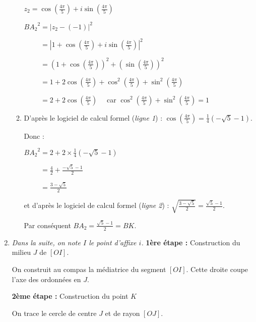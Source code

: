 \begin{corrige}
\begin{enumerate}
\begin{enumerate}[label=\alph*.]
          $z_2=\cos\left(\frac{4\pi}{5}\right)+i\sin\left(\frac{4\pi}{5}\right)$
          \par
          $B{A_2}^2=\left|z_2-(-1) \right|^2$
          \par
          $\phantom{B{A_2}^2}=\left|1+\cos\left(\frac{4\pi}{5}\right)+i\sin\left(\frac{4\pi}{5}\right) \right|^2$
          \par
          $\phantom{B{A_2}^2}=\left(1+\cos\left(\frac{4\pi}{5}\right)\right)^2+\left(\sin\left(\frac{4\pi}{5}\right) \right)^2$
          \par
          $\phantom{B{A_2}^2}=1+2\cos\left(\frac{4\pi}{5}\right)+\cos^2\left(\frac{4\pi}{5}\right)+\sin^2\left(\frac{4\pi}{5}\right)$
          \par
          $\phantom{B{A_2}^2}=2+2\cos\left(\frac{4\pi}{5}\right)\quad$ car $\cos^2\left(\frac{4\pi}{5}\right)+\sin^2\left(\frac{4\pi}{5}\right)=1 $
          \item
          D'après le logiciel de calcul formel (\textit{ligne 1}) : $\cos\left(\frac{4\pi}{5}\right)=  \frac{1}{4}\left(- \sqrt{5}-1\right)$.
          \par
          Donc :
          \par
          $B{A_2}^2=2+2 \times \frac{1}{4}\left(-\sqrt{5}-1\right)$
          \par
          $\phantom{B{A_2}^2}=\frac{4}{2}+\frac{-\sqrt{5}-1}{2}$
          \par
          $\phantom{B{A_2}^2}=\frac{3-\sqrt{5}}{2}$
          \par
          et d'après le logiciel de calcul formel (\textit{ligne 2}) : $\sqrt{\frac{3-\sqrt{5}}{2}} = \frac{\sqrt{5}-1}{2} $.
          \par
          Par conséquent $BA_2=\frac{\sqrt{5}-1}{2}=BK$.
     \end{enumerate}
     \item
     \textit{Dans la suite, on note $I$ le point d'affixe $i$.}
     \textbf{1ère étape : } Construction du milieu $J$ de $[OI]$.
     \par
     On construit au compas la médiatrice du segment $[OI]$. Cette droite coupe l'axe des ordonnées en $J$.
\begin{center}
\end{center}
     \textbf{2ème étape : } Construction du point $K$
     \par
     On trace le cercle de centre $J$ et de rayon $[OJ]$.

\end{enumerate}
\end{corrige}

